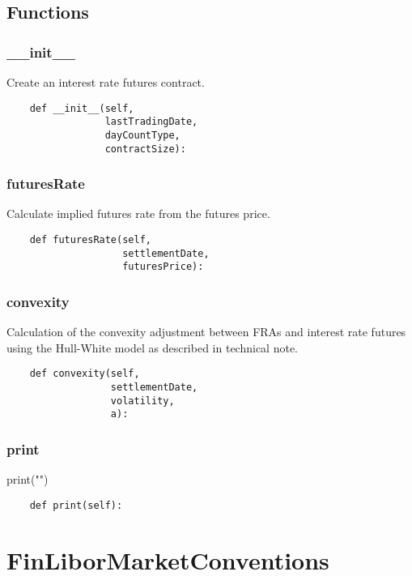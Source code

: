 \documentclass[twoside,11pt]{book}
\begin{document}
\subsection*{Functions}

\subsubsection*{{\bf \_\_init\_\_}}
Create an interest rate futures contract. 

\begin{lstlisting}
    def __init__(self,
                 lastTradingDate,
                 dayCountType,
                 contractSize):
\end{lstlisting}

\subsubsection*{{\bf futuresRate}}
Calculate implied futures rate from the futures price. 

\begin{lstlisting}
    def futuresRate(self,
                    settlementDate,
                    futuresPrice):
\end{lstlisting}

\subsubsection*{{\bf convexity}}
Calculation of the convexity adjustment between FRAs and interest rate futures using the Hull-White model as described in technical note.  

\begin{lstlisting}
    def convexity(self,
                  settlementDate,
                  volatility,
                  a):
\end{lstlisting}

\subsubsection*{{\bf print}}
print("") 

\begin{lstlisting}
    def print(self):
\end{lstlisting}

\newpage
\section{FinLiborMarketConventions}
\end{document}
